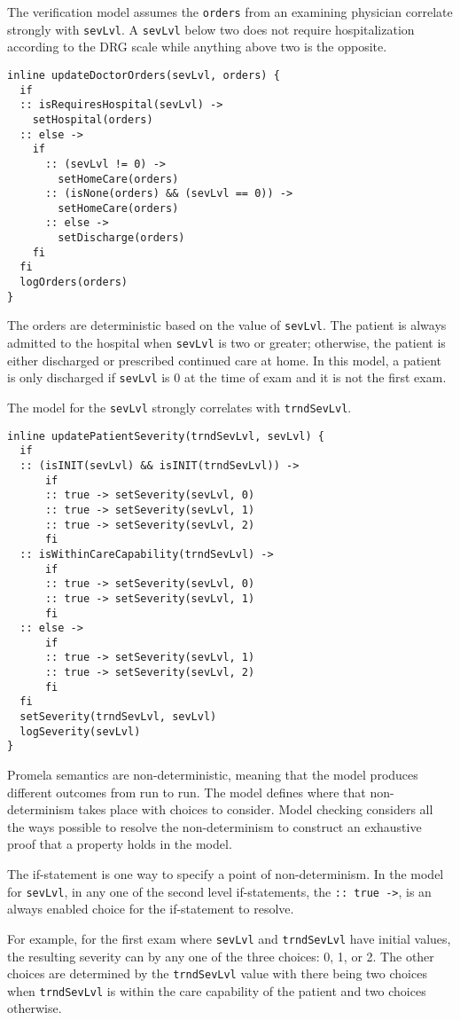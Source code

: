 The verification model assumes the \texttt{orders} from an examining physician correlate strongly with \texttt{sevLvl}. A \texttt{sevLvl} below two does not require hospitalization according to the DRG scale while anything above two is the opposite.
%
{\small
\begin{lstlisting}[style=myPromela]
inline updateDoctorOrders(sevLvl, orders) {
  if
  :: isRequiresHospital(sevLvl) ->
    setHospital(orders)
  :: else ->
    if
      :: (sevLvl != 0) -> 
        setHomeCare(orders)
      :: (isNone(orders) && (sevLvl == 0)) ->
        setHomeCare(orders)
      :: else -> 
        setDischarge(orders)
    fi
  fi
  logOrders(orders)
}
\end{lstlisting}
}
%
\noindent The orders are deterministic based on the value of \texttt{sevLvl}. The patient is always admitted to the hospital when \texttt{sevLvl} is two or greater; otherwise, the patient is either discharged or prescribed continued care at home. In this model, a patient is only discharged if \texttt{sevLvl} is 0 at the time of exam and it is not the first exam.

The model for the \texttt{sevLvl} strongly correlates with \texttt{trndSevLvl}.
%
{\small
\begin{lstlisting}[style=myPromela]
inline updatePatientSeverity(trndSevLvl, sevLvl) {
  if
  :: (isINIT(sevLvl) && isINIT(trndSevLvl)) -> 
      if
      :: true -> setSeverity(sevLvl, 0)
      :: true -> setSeverity(sevLvl, 1)
      :: true -> setSeverity(sevLvl, 2)
      fi 
  :: isWithinCareCapability(trndSevLvl) -> 
      if
      :: true -> setSeverity(sevLvl, 0)
      :: true -> setSeverity(sevLvl, 1)
      fi
  :: else -> 
      if
      :: true -> setSeverity(sevLvl, 1)
      :: true -> setSeverity(sevLvl, 2)
      fi
  fi
  setSeverity(trndSevLvl, sevLvl)
  logSeverity(sevLvl)
}
\end{lstlisting}
}
%
\noindent Promela semantics are non-deterministic, meaning that the model produces different outcomes from run to run. The model defines where that non-determinism takes place with choices to consider. Model checking considers all the ways possible to resolve the non-determinism to construct an exhaustive proof that a property holds in the model. 

The if-statement is one way to specify a point of non-determinism. In the model for \texttt{sevLvl}, in any one of the second level if-statements, the \texttt{:: true ->}, is an always enabled choice for the if-statement to resolve. 

For example, for the first exam where \texttt{sevLvl} and \texttt{trndSevLvl} have initial values, the resulting severity can by any one of the three choices: 0, 1, or 2. The other choices are determined by the \texttt{trndSevLvl} value with there being two choices when \texttt{trndSevLvl} is within the care capability of the patient and two choices otherwise.

